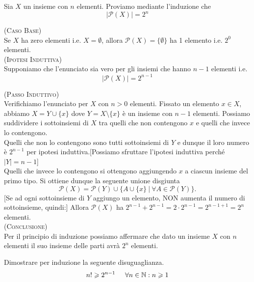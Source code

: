 
\begin{esercizio}
Sia $X$ un insieme con $n$ elementi. Proviamo mediante l'induzione che
$$|\mathcal{P}(X)| = 2^n$$
\end{esercizio}

\begin{soluzione}
\textsc{(Caso Base)}\\
 Se $X$ ha zero elementi i.e. $X=\emptyset$, allora $\mathcal{P}(X)=\{\emptyset\}$ ha 1 elemento i.e. $2^0$ elementi. \\

\textsc{(Ipotesi Induttiva)}\\
Supponiamo che l'enunciato sia vero per gli insiemi che hanno $n-1$ elementi i.e. 
$$|\mathcal{P}(X)| = 2^{n-1}$$

\textsc{(Passo Induttivo)}\\
Verifichiamo l'enunciato per $X$ con $n>0$ elementi. Fissato un elemento $x\in X$, abbiamo $X=Y\cup \{x\}$ dove $Y=X\setminus \{x\}$ è un insieme con $n-1$ elementi. Possiamo suddividere i sottoinsiemi di $X$ tra quelli che non contengono $x$ e quelli che invece lo contengono.\\
Quelli che non lo contengono sono tutti sottoinsiemi di $Y$ e dunque il loro numero è $2^{n-1}$ per ipotesi induttiva.[Possiamo sfruttare l'ipotesi induttiva perché $|Y|=n-1$]\\
Quelli che invece lo contengono si ottengono aggiungendo $x$ a ciascun insieme del primo tipo. Si ottiene dunque la seguente unione disgiunta
$$\mathcal{P}(X)=\mathcal{P}(Y)\cup \{A\cup \{x\}\ |\ \forall A\in \mathcal{P}(Y)\}.$$
[Se ad ogni sottoinsieme di $Y$ aggiungo un elemento, NON aumenta il numero di sottoinsieme, quindi:]
Allora $\mathcal{P}(X)$ ha $2^{n-1}+2^{n-1}=2\cdot 2^{n-1}=2^{n-1+1}=2^n$ elementi.\\

\textsc{(Conclusione)}\\
Per il principio di induzione possiamo affermare che dato un insieme $X$ con $n$ elementi il suo insieme delle parti avrà $2^n$ elementi.\\
\end{soluzione}


\begin{esercizio}
Dimostrare per induzione la seguente disuguaglianza. 
$$n! \geqslant 2^{n-1} \hspace{.5cm} \forall n \in \mathbb{N} : n \geqslant 1$$
\end{esercizio}

